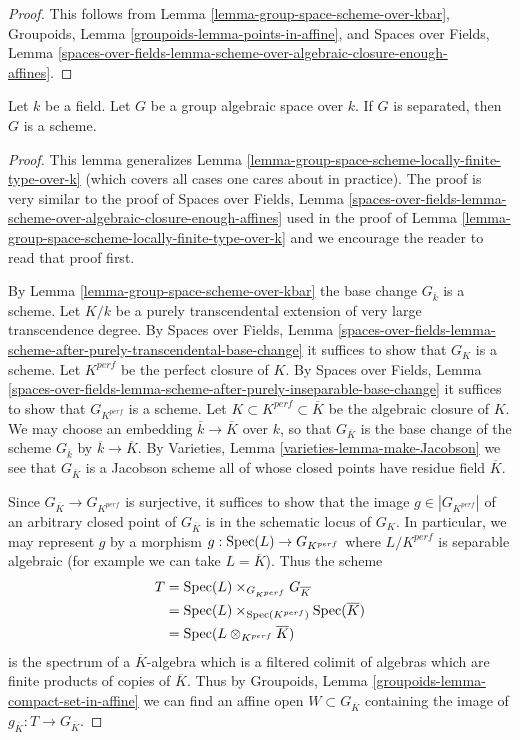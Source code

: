 \begin{proof}
This follows from
Lemma \ref{lemma-group-space-scheme-over-kbar},
Groupoids, Lemma \ref{groupoids-lemma-points-in-affine}, and
Spaces over Fields, Lemma
\ref{spaces-over-fields-lemma-scheme-over-algebraic-closure-enough-affines}.
\end{proof}

\begin{proposition}
\label{proposition-group-space-scheme-over-field}
Let $k$ be a field. Let $G$ be a group algebraic space over $k$.
If $G$ is separated, then $G$ is a scheme.
\end{proposition}

\begin{proof}
This lemma generalizes
Lemma \ref{lemma-group-space-scheme-locally-finite-type-over-k}
(which covers all cases one cares about in practice).
The proof is very similar to the proof of
Spaces over Fields, Lemma
\ref{spaces-over-fields-lemma-scheme-over-algebraic-closure-enough-affines}
used in the proof of
Lemma \ref{lemma-group-space-scheme-locally-finite-type-over-k}
and we encourage the reader to read that proof first.

\medskip\noindent
By Lemma \ref{lemma-group-space-scheme-over-kbar} the base
change $G_{\overline{k}}$ is a scheme.
Let $K/k$ be a purely transcendental extension of very large
transcendence degree. By Spaces over Fields, Lemma
\ref{spaces-over-fields-lemma-scheme-after-purely-transcendental-base-change}
it suffices to show that $G_K$ is a scheme.
Let $K^{perf}$ be the perfect closure of $K$. By
Spaces over Fields, Lemma
\ref{spaces-over-fields-lemma-scheme-after-purely-inseparable-base-change}
it suffices to show that $G_{K^{perf}}$ is a scheme.
Let $K \subset K^{perf} \subset \overline{K}$ be the algebraic closure
of $K$. We may choose an embedding $\overline{k} \to \overline{K}$ over
$k$, so that $G_{\overline{K}}$ is the base change of the scheme
$G_{\overline{k}}$ by $\overline{k} \to \overline{K}$. By
Varieties, Lemma \ref{varieties-lemma-make-Jacobson}
we see that $G_{\overline{K}}$ is a Jacobson scheme all of whose
closed points have residue field $\overline{K}$.

\medskip\noindent
Since $G_{\overline{K}} \to G_{K^{perf}}$ is surjective, it suffices to
show that the image $g \in |G_{K^{perf}}|$ of an arbitrary closed point of
$G_{\overline{K}}$ is in the schematic locus of $G_K$.
In particular, we may represent $g$ by a morphism
$g : \mathop{\mathrm{Spec}}(L) \to G_{K^{perf}}$ where $L/K^{perf}$ is separable algebraic
(for example we can take $L = \overline{K}$). Thus the scheme
\begin{align*}
T & = \mathop{\mathrm{Spec}}(L) \times_{G_{K^{perf}}} G_{\overline{K}} \\
& =
\mathop{\mathrm{Spec}}(L) \times_{\mathop{\mathrm{Spec}}(K^{perf})} \mathop{\mathrm{Spec}}(\overline{K}) \\
& =
\mathop{\mathrm{Spec}}(L \otimes_{K^{perf}} \overline{K})
\end{align*}
is the spectrum of a $\overline{K}$-algebra which is a filtered colimit
of algebras which are finite products of copies of $\overline{K}$.
Thus by Groupoids, Lemma \ref{groupoids-lemma-compact-set-in-affine}
we can find an affine open $W \subset G_{\overline{K}}$ containing
the image of $g_{\overline{K}} : T \to G_{\overline{K}}$.


\end{proof}
